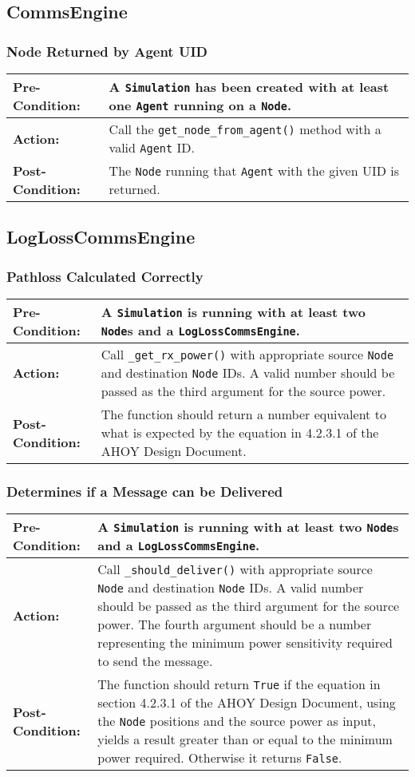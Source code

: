 \documentclass[titlepage]{article}
\newcommand{\testcase}[3]{
    \begin{center}
    \begin{tabular}{| l | p{0.7\textwidth}|}
        \hline
        \rowcolor[gray]{0.8}\textbf{Pre-Condition:} & #1 \\ \hline
        \textbf{Action:} & #2 \\ \hline
        \rowcolor[gray]{0.8}\textbf{Post-Condition:} & #3 \\ \hline
    \end{tabular}
    \end{center}
}
\begin{document}
\subsection{CommsEngine}
\subsubsection{Node Returned by Agent UID}
\testcase{A \texttt{Simulation} has been created with at least one \texttt{Agent} running on a \texttt{Node}. }{Call the \texttt{get\_node\_from\_agent()} method with a valid \texttt{Agent} ID.}{The \texttt{Node} running that \texttt{Agent} with the given UID is returned.}


\subsection{LogLossCommsEngine}
\subsubsection{Pathloss Calculated Correctly}
\testcase{A \texttt{Simulation} is running with at least two \texttt{Node}s and a \texttt{LogLossCommsEngine}. }{Call \texttt{\_get\_rx\_power()} with appropriate source \texttt{Node} and destination \texttt{Node} IDs. A valid number should be passed as the third argument for the source power.}{The function should return a number equivalent to what is expected by the equation in 4.2.3.1 of the AHOY Design Document.}

\subsubsection{Determines if a Message can be Delivered}
\testcase{A \texttt{Simulation} is running with at least two \texttt{Node}s and a \texttt{LogLossCommsEngine}.}{Call \texttt{\_should\_deliver()} with appropriate source \texttt{Node} and destination \texttt{Node} IDs. A valid number should be passed as the third argument for the source power. The fourth argument should be a number representing the minimum power sensitivity required to send the message.}{The function should return \texttt{True} if the equation in section 4.2.3.1 of the AHOY Design Document, using the \texttt{Node} positions and the source power as input, yields a result greater than or equal to the minimum power required. Otherwise it returns \texttt{False}.}
\end{document}
